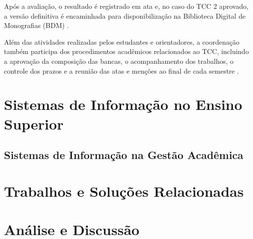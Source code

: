 Após a avaliação, o resultado é registrado em ata e, no caso do TCC 2 aprovado, a versão definitiva é encaminhada para disponibilização na Biblioteca Digital de Monografias (BDM) \cite{UnB2022}.

Além das atividades realizadas pelos estudantes e orientadores, a coordenação também participa dos procedimentos acadêmicos
relacionados ao TCC, incluindo a aprovação da composição das bancas, o acompanhamento dos trabalhos, o controle dos prazos e a reunião das atas e menções ao final de cada semestre \cite{UnB2022}.

\section{Sistemas de Informação no Ensino Superior}

\subsection{Sistemas de Informação na Gestão Acadêmica}

\section{Trabalhos e Soluções Relacionadas}

\section{Análise e Discussão}